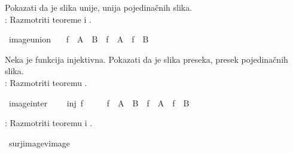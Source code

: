 %
\begin{isabellebody}%
%
%
\isadelimtheory
%
\endisadelimtheory
%
\isatagtheory
%
\endisatagtheory
{\isafoldtheory}%
%
\isadelimtheory
%
\endisadelimtheory
%
\begin{exercise}[subtitle=Svojstva funkcija]
%
\begin{isamarkuptext}%
Pokazati da je slika unije, unija pojedinačnih slika.\\
      : Razmotriti teoreme  i .%
\end{isamarkuptext}\isamarkuptrue%
\isamarkupfalse%
\ image{\isacharunderscore}{\kern0pt}union{\isacharcolon}{\kern0pt}\isanewline
\ \ \ {\isachardoublequoteopen}f\ {\isacharbackquote}{\kern0pt}\ {\isacharparenleft}{\kern0pt}A\ {\isasymunion}\ B{\isacharparenright}{\kern0pt}\ {\isacharequal}{\kern0pt}\ f\ {\isacharbackquote}{\kern0pt}\ A\ {\isasymunion}\ f\ {\isacharbackquote}{\kern0pt}\ B{\isachardoublequoteclose}%
\isadelimproof
%
\endisadelimproof
%
\isatagproof
%
\endisatagproof
{\isafoldproof}%
%
\isadelimproof
%
\endisadelimproof
%
\begin{isamarkuptext}%
Neka je funkcija  injektivna. 
      Pokazati da je slika preseka, presek pojedinačnih slika.\\
      : Razmotriti teoremu .%
\end{isamarkuptext}\isamarkuptrue%
\isamarkupfalse%
\ image{\isacharunderscore}{\kern0pt}inter{\isacharcolon}{\kern0pt}\ \isanewline
\ \ \ {\isachardoublequoteopen}inj\ f{\isachardoublequoteclose}\isanewline
\ \ \ \ \ {\isachardoublequoteopen}f\ {\isacharbackquote}{\kern0pt}\ {\isacharparenleft}{\kern0pt}A\ {\isasyminter}\ B{\isacharparenright}{\kern0pt}\ {\isacharequal}{\kern0pt}\ f\ {\isacharbackquote}{\kern0pt}\ A\ {\isasyminter}\ f\ {\isacharbackquote}{\kern0pt}\ B{\isachardoublequoteclose}%
\isadelimproof
%
\endisadelimproof
%
\isatagproof
%
\endisatagproof
{\isafoldproof}%
%
\isadelimproof
%
\endisadelimproof
%
\begin{isamarkuptext}%
: Razmotriti teoremu  i .%
\end{isamarkuptext}\isamarkuptrue%
\isamarkupfalse%
\ surj{\isacharunderscore}{\kern0pt}image{\isacharunderscore}{\kern0pt}vimage{\isacharcolon}{\kern0pt}\isanewline

\end{exercise}
\end{isabellebody}
